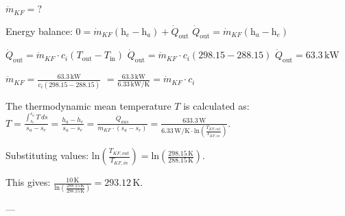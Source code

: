 \( \dot{m}_{KF} = ? \)  

Energy balance:  
\( 0 = \dot{m}_{KF} (\text{h}_e - \text{h}_a) + \dot{Q}_{\text{out}} \)  
\( \dot{Q}_{\text{out}} = \dot{m}_{KF} (\text{h}_a - \text{h}_e) \)  

\( \dot{Q}_{\text{out}} = \dot{m}_{KF} \cdot c_i \left( T_{\text{out}} - T_{\text{in}} \right) \)  
\( \dot{Q}_{\text{out}} = \dot{m}_{KF} \cdot c_i \left( 298.15 - 288.15 \right) \)  
\( \dot{Q}_{\text{out}} = 63.3 \, \text{kW} \)  

\( \dot{m}_{KF} = \frac{63.3 \, \text{kW}}{c_i (298.15 - 288.15)} \)  
\( = \frac{63.3 \, \text{kW}}{6.33 \, \text{kW/K}} = \dot{m}_{KF} \cdot c_i \)

The thermodynamic mean temperature \( T \) is calculated as:  
\( T = \frac{\int_{s_e}^{s_a} T \, ds}{s_a - s_e} = \frac{h_a - h_e}{s_a - s_e} = \frac{\dot{Q}_{aus}}{\dot{m}_{KF} \cdot (s_a - s_e)} = \frac{633.3 \, \text{W}}{6.33 \, \text{W/K} \cdot \text{ln} \left( \frac{T_{KF,out}}{T_{KF,in}} \right)} \).  

Substituting values:  
\( \text{ln} \left( \frac{T_{KF,out}}{T_{KF,in}} \right) = \text{ln} \left( \frac{298.15 \, \text{K}}{288.15 \, \text{K}} \right) \).  

This gives:  
\( \frac{10 \, \text{K}}{\text{ln} \left( \frac{288.15 \, \text{K}}{298.15 \, \text{K}} \right)} = 293.12 \, \text{K} \).  

---